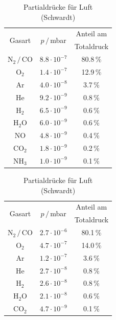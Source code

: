 \documentclass[german, parskip=full]{scrartcl}
\newcommand{\tecxt}{}
\begin{document}
\begin{table}[!htp]
\centering
\begin{minipage}{0.5\textwidth}
\centering
\begin{tabular}{c|c|c}
\multirow{2}{*}{Gasart}&\multirow{2}{*}{$p\,/\,$mbar}&Anteil am \\ &&Totaldruck\\ \hline
$\tecxt\text{N}_2\,/\,\tecxt\text{CO}$&$8.8\cdot 10^{-7}$&80.8\,\%\\ \hline
$\tecxt\text{O}_2$&$1.4\cdot 10^{-7}$&12.9\,\%\\ \hline
Ar&$4.0\cdot 10^{-8}$&3.7\,\%\\ \hline
$\tecxt\text{He}$&$9.2\cdot 10^{-9}$&0.8\,\%\\ \hline
$\tecxt\text{H}_2$&$6.5\cdot 10^{-9}$&0.6\,\%\\ \hline
$\tecxt\text{H}_2\tecxt\text{O}$&$6.0\cdot 10^{-9}$&0.6\,\%\\ \hline
$\tecxt\text{NO}$&$4.8\cdot 10^{-9}$&0.4\,\%\\ \hline
$\tecxt\text{CO}_2$&$1.8\cdot 10^{-9}$&0.2\,\%\\ \hline
$\tecxt\text{NH}_3$&$1.0\cdot 10^{-9}$&0.1\,\%\\
\end{tabular}
\caption{Partialdrücke für Luft\\ (Romstedt)}
\label{table:LuftspektrumPartialRomstedt}
\end{minipage}%
\begin{minipage}{0.5\textwidth}
\centering
\begin{tabular}{c|c|c}
\multirow{2}{*}{Gasart}&\multirow{2}{*}{$p\,/\,$mbar}&Anteil am \\ &&Totaldruck\\ \hline
$\tecxt\text{N}_2\,/\,\tecxt\text{CO}$&$2.7\cdot 10^{-6}$&80.1\,\%\\ \hline
$\tecxt\text{O}_2$&$4.7\cdot 10^{-7}$&14.0\,\%\\ \hline
Ar&$1.2\cdot 10^{-7}$&3.6\,\%\\ \hline
$\tecxt\text{He}$&$2.7\cdot 10^{-8}$&0.8\,\%\\ \hline
$\tecxt\text{H}_2$&$2.6\cdot 10^{-8}$&0.8\,\%\\ \hline
$\tecxt\text{H}_2\tecxt\text{O}$&$2.1\cdot 10^{-8}$&0.6\,\%\\ \hline
$\tecxt\text{CO}_2$&$4.7\cdot 10^{-9}$&0.1\,\%\\ 
\end{tabular}
\caption{Partialdrücke für Luft\\ (Schwardt)}
\label{table:LuftspektrumPartialSchwardt}
\end{minipage}
\end{table}\\
\end{document}
